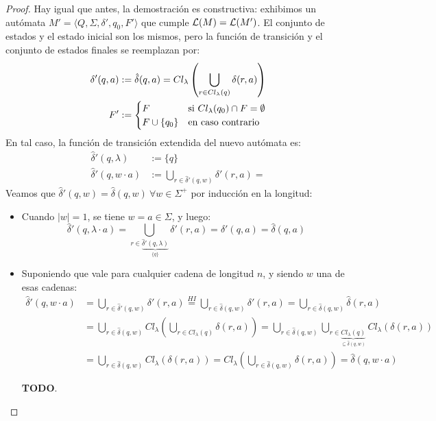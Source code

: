 \begin{proof}
    Hay igual que antes, la demostración es constructiva: exhibimos un autómata $M' = \langle Q, \Sigma, \delta', q_0, F' \rangle$ que cumple $\mathcal{L}(M) = \mathcal{L}(M')$. El conjunto de estados y el estado inicial son los mismos, pero la función de transición y el conjunto de estados finales se reemplazan por:
    $$
    \begin{aligned}
        \delta'(q, a) & := \hat \delta (q, a) = Cl_\lambda\left(\bigcup_{r \in Cl_\lambda(q)} \delta(r, a)\right) \\
        F' & := \begin{cases}
            F & \text{si } Cl_\lambda (q_0) \cap F = \emptyset \\
            F \cup \{q_0\} & \text{en caso contrario}
        \end{cases}
    \end{aligned}
    $$
    En tal caso, la función de transición extendida del nuevo autómata es:
    $$
    \begin{aligned}
        \hat \delta'(q, \lambda) & := \{q\} \\
        \hat \delta'(q, w \cdot a) & := \bigcup_{r \in \hat \delta'(q, w)} \delta'(r, a) = 
    \end{aligned}
    $$
    Veamos que $\hat \delta'(q, w) = \hat \delta(q, w) \ \forall w \in \Sigma^+$ por inducción en la longitud:
    \begin{itemize}
        \item Cuando $|w| = 1$, se tiene $w = a \in \Sigma$, y luego:
        $$
        \hat \delta'(q, \lambda \cdot a)
        = \bigcup_{r \in \underbrace{\hat \delta'(q, \lambda)}_{\{q\}} } \delta'(r, a)
        = \delta'(q, a) = \hat \delta(q, a)$$
        \item Suponiendo que vale para cualquier cadena de longitud $n$, y siendo $w$ una de esas cadenas:
        $$
        \begin{aligned}
            \hat \delta'(q, w \cdot a)
            & = \bigcup_{r \in \hat \delta'(q, w)} \delta'(r, a)
            \overset{HI}{=} \bigcup_{r \in \hat \delta(q, w)} \delta'(r, a)
            = \bigcup_{r \in \hat \delta(q, w)} \hat \delta(r, a) \\
            & = \bigcup_{r \in \hat \delta(q, w)} Cl_\lambda\left(\bigcup_{r \in Cl_\lambda(q)} \delta(r, a)\right) = \bigcup_{r \in \hat \delta(q, w)} \bigcup_{r \in \underbrace{Cl_\lambda(q)}_{\subseteq \hat \delta(q, w)}} Cl_\lambda(\delta(r, a)) \\
            & = \bigcup_{r \in \hat \delta(q, w)} Cl_\lambda(\delta(r, a)) = Cl_\lambda\left(\bigcup_{r \in \hat \delta(q, w)} \delta(r, a)\right) = \hat \delta (q, w \cdot a)
        \end{aligned}
        $$

    \textbf{TODO}.
    \end{itemize}
\end{proof}
